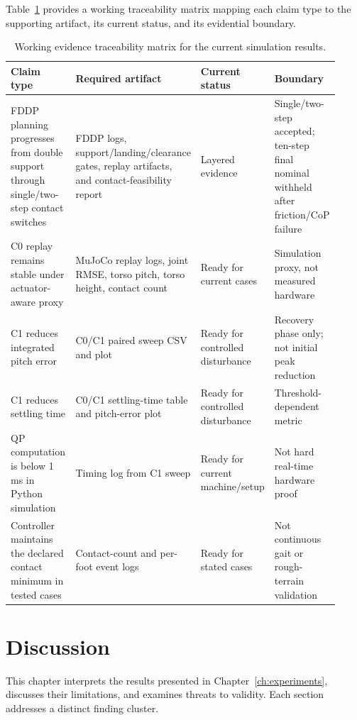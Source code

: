 \documentclass[12pt,a4paper]{report}
\begin{document}
Table~\ref{tab:evidence_traceability} provides a working traceability matrix mapping each claim type to the supporting artifact, its current status, and its evidential boundary.
 
\begin{table}[htbp]
\centering
\caption{Working evidence traceability matrix for the current simulation results.}
\label{tab:evidence_traceability}
\begin{tabular}{@{}p{0.24\linewidth}p{0.28\linewidth}p{0.18\linewidth}p{0.22\linewidth}@{}}
\toprule
Claim type & Required artifact & Current status & Boundary \\
\midrule
FDDP planning progresses from double support through single/two-step contact switches & FDDP logs, support/landing/clearance gates, replay artifacts, and contact-feasibility report & Layered evidence & Single/two-step accepted; ten-step final nominal withheld after friction/CoP failure \\
C0 replay remains stable under actuator-aware proxy & MuJoCo replay logs, joint RMSE, torso pitch, torso height, contact count & Ready for current cases & Simulation proxy, not measured hardware \\
C1 reduces integrated pitch error & C0/C1 paired sweep CSV and plot & Ready for controlled disturbance & Recovery phase only; not initial peak reduction \\
C1 reduces settling time & C0/C1 settling-time table and pitch-error plot & Ready for controlled disturbance & Threshold-dependent metric \\
QP computation is below 1 ms in Python simulation & Timing log from C1 sweep & Ready for current machine/setup & Not hard real-time hardware proof \\
Controller maintains the declared contact minimum in tested cases & Contact-count and per-foot event logs & Ready for stated cases & Not continuous gait or rough-terrain validation \\
\bottomrule
\end{tabular}
\end{table}
 
\chapter{Discussion}\label{ch:discussion}
 
This chapter interprets the results presented in Chapter~\ref{ch:experiments}, discusses their limitations, and examines threats to validity. Each section addresses a distinct finding cluster.
 
\end{document}
